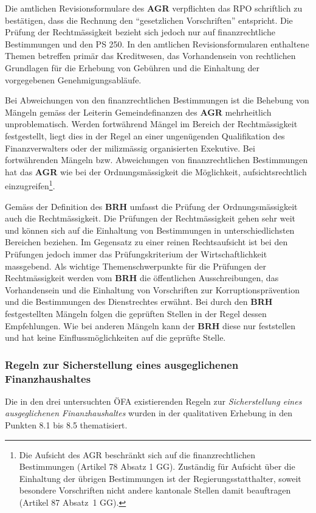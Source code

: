 \documentclass[10pt]{article}
\begin{document}
Die amtlichen Revisionsformulare des \textbf{AGR} verpflichten das RPO schriftlich zu bestätigen, dass die Rechnung den “{}gesetzlichen Vorschriften”{} entspricht. Die Prüfung der Rechtmässigkeit bezieht sich jedoch nur auf finanzrechtliche Bestimmungen und den PS 250. In den amtlichen Revisionsformularen enthaltene Themen betreffen primär das Kreditwesen, das Vorhandensein von rechtlichen Grundlagen für die Erhebung von Gebühren und die Einhaltung der vorgegebenen Genehmigungsabläufe. 

Bei Abweichungen von den finanzrechtlichen Bestimmungen ist die Behebung von Mängeln gemäss der Leiterin Gemeindefinanzen des \textbf{AGR} mehrheitlich unproblematisch. Werden fortwährend Mängel im Bereich der Rechtmässigkeit festgestellt, liegt dies in der Regel an einer ungenügenden Qualifikation des Finanzverwalters oder der milizmässig organisierten Exekutive. Bei fortwährenden Mängeln bzw. Abweichungen von finanzrechtlichen Bestimmungen hat das \textbf{AGR} wie bei der Ordnungsmässigkeit die Möglichkeit, aufsichtsrechtlich einzugreifen\footnote{Die Aufsicht des AGR beschränkt sich auf die finanzrechtlichen Bestimmungen (Artikel 78 Absatz 1 GG). Zuständig für Aufsicht über die Einhaltung der übrigen Bestimmungen ist der Regierungsstatthalter, soweit besondere Vorschriften nicht andere kantonale Stellen damit beauftragen (Artikel 87 Absatz 1 GG).}.

Gemäss der Definition des \textbf{BRH} umfasst die Prüfung der Ordnungsmässigkeit auch die Rechtmässigkeit. Die Prüfungen der Rechtmässigkeit gehen sehr weit und können sich auf die Einhaltung von Bestimmungen in unterschiedlichsten Bereichen beziehen. Im Gegensatz zu einer reinen Rechtsaufsicht ist bei den Prüfungen jedoch immer das Prüfungskriterium der Wirtschaftlichkeit massgebend. Als wichtige Themenschwerpunkte für die Prüfungen der Rechtmässigkeit werden vom \textbf{BRH} die öffentlichen Ausschreibungen, das Vorhandensein und die Einhaltung von Vorschriften zur Korruptionsprävention und die Bestimmungen des Dienstrechtes erwähnt. Bei durch den \textbf{BRH} festgestellten Mängeln folgen die geprüften Stellen in der Regel dessen Empfehlungen. Wie bei anderen Mängeln kann der \textbf{BRH} diese nur feststellen und hat keine Einflussmöglichkeiten auf die geprüfte Stelle.

\subsubsection{Regeln zur Sicherstellung eines ausgeglichenen Finanzhaushaltes}\label{subsubsec:regeln_zur_sicherstellung_eines_ausgeglichenen_finanzhaushaltes}
Die in den drei untersuchten ÖFA existierenden Regeln zur \textit{Sicherstellung eines ausgeglichenen Finanzhaushaltes} wurden in der qualitativen Erhebung in den Punkten 8.1 bis 8.5 thematisiert.
\end{document}
